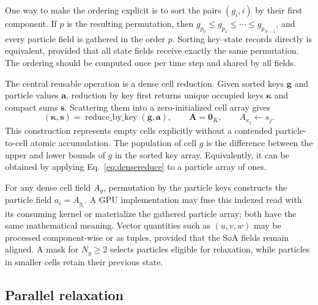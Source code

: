 \documentclass[a4paper,11pt]{article}
\newcommand{\vect}[1]{\bm{#1}}
\begin{document}
One way to make the ordering explicit is to sort the pairs $(g_i,i)$ by their
first component.  If $p$ is the resulting permutation, then
$g_{p_0}\leq g_{p_1}\leq\cdots\leq g_{p_{N-1}}$, and every particle field is
gathered in the order $p$.  Sorting key--state records directly is equivalent,
provided that all state fields receive exactly the same permutation.  The
ordering should be computed once per time step and shared by all fields.

The central reusable operation is a dense cell reduction.  Given sorted keys
$\vect{g}$ and particle values $\vect{a}$, reduction by key first returns
unique occupied keys $\vect{\kappa}$ and compact sums $\vect{s}$.  Scattering
them into a zero-initialized cell array gives
\begin{equation}
 (\vect{\kappa},\vect{s})=\operatorname{reduce\_by\_key}
 (\vect{g},\vect{a}),\qquad
 \vect{A}=\vect{0}_K,\qquad
 A_{\kappa_j}\leftarrow s_j.
 \label{eq:densereduce}
\end{equation}
This construction represents empty cells explicitly without a contended
particle-to-cell atomic accumulation.  The population of cell $g$ is the
difference between the upper and lower bounds of $g$ in the sorted key array.
Equivalently, it can be obtained by applying Eq.~\eqref{eq:densereduce} to a
particle array of ones.

For any dense cell field $A_g$, permutation by the particle keys constructs the
particle field $a_i=A_{g_i}$.  A GPU implementation may fuse this indexed read
with its consuming kernel or materialize the gathered particle array; both have
the same mathematical meaning.  Vector quantities such as $(u,v,w)$ may be
processed component-wise or as tuples, provided that the SoA fields remain
aligned.  A mask for $N_g\geq2$ selects particles eligible for relaxation, while
particles in smaller cells retain their previous state.

\subsection{Parallel relaxation}
\end{document}
